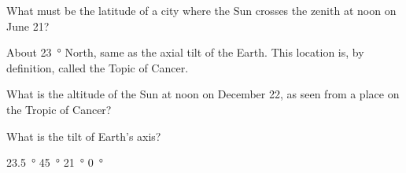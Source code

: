 \documentclass[addpoints]{exam}
\begin{document}
\begin{questions}
\question
What must be the latitude of a city where the Sun crosses the zenith at noon on June 21?

\begin{solution}
About \SI{23}{\degree} North, same as the axial tilt of the Earth. This location is, by definition, called the Topic of Cancer.
\end{solution}

\question %
What is the altitude of the Sun at noon on December 22, as seen from a place on the Tropic of Cancer?












\question
What is the tilt of Earth's axis?

\begin{choices}
    \correctchoice \SI{23.5}{\degree}
    \choice \SI{45}{\degree}
    \choice \SI{21}{\degree}
    \choice \SI{0}{\degree}
\end{choices}


\end{questions}
\end{document}
